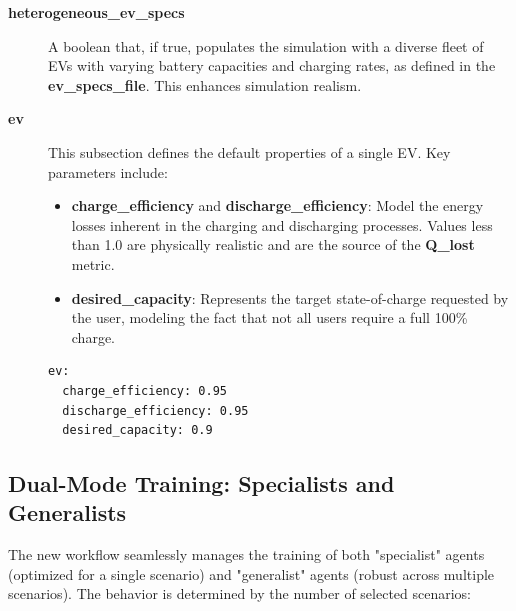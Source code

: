 \begin{description}
    \item[\textbf{\textbf{heterogeneous\_ev\_specs}}] A boolean that, if true, populates the simulation with a diverse fleet of EVs with varying battery capacities and charging rates, as defined in the \textbf{ev\_specs\_file}. This enhances simulation realism.
    
    \item[\textbf{\textbf{ev}}] This subsection defines the default properties of a single EV. Key parameters include:
    \begin{itemize}
        \item \textbf{charge\_efficiency} and \textbf{discharge\_efficiency}: Model the energy losses inherent in the charging and discharging processes. Values less than 1.0 are physically realistic and are the source of the \textbf{Q\_lost} metric.
        \item \textbf{desired\_capacity}: Represents the target state-of-charge requested by the user, modeling the fact that not all users require a full 100\% charge.
    \end{itemize}
    \begin{lstlisting}
ev:
  charge_efficiency: 0.95
  discharge_efficiency: 0.95
  desired_capacity: 0.9 
    \end{lstlisting}
\end{description}




\subsection{Dual-Mode Training: Specialists and Generalists}

The new workflow seamlessly manages the training of both "specialist" agents (optimized for a single scenario) and "generalist" agents (robust across multiple scenarios). The behavior is determined by the number of selected scenarios:


